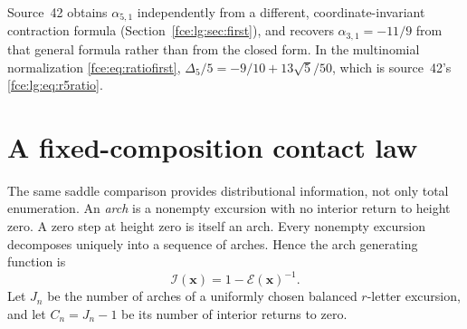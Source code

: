 \documentclass[11pt,a4paper]{article}
\numberwithin{equation}{section}
\theoremstyle{definition}\newtheorem{definition}[theorem]{Definition}
\theoremstyle{remark}\newtheorem{remark}[theorem]{Remark}
\newcommand{\E}{\mathcal E}
\begin{document}
Source~42 obtains $\alpha_{5,1}$ independently from a different,
coordinate-invariant contraction formula (Section~\ref{fce:lg:sec:first}),
and recovers $\alpha_{3,1}=-11/9$ from that general formula rather than
from the closed form. In the multinomial normalization
\eqref{fce:eq:ratiofirst}, $\Delta_5/5=-9/10+13\sqrt5/50$, which is
source~42's \eqref{fce:lg:eq:r5ratio}.

\section{A fixed-composition contact law}\label{fce:sec:contacts}
The same saddle comparison provides distributional information, not only
total enumeration. An \emph{arch} is a nonempty excursion with no interior
return to height zero. A zero step at height zero is itself an arch.
Every nonempty excursion decomposes uniquely into a sequence of arches.
Hence the arch generating function is
\[
 \mathcal I(\boldsymbol x)=1-\E(\boldsymbol x)^{-1}.
\]
Let $J_n$ be the number of arches of a uniformly chosen balanced
$r$-letter excursion, and let $C_n=J_n-1$ be its number of interior
returns to zero.
\end{document}
